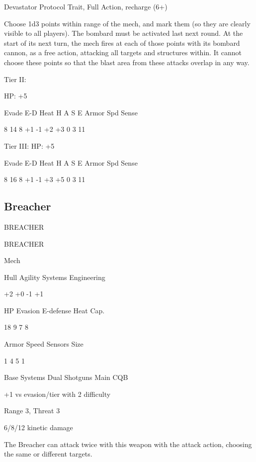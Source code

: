 Devastator Protocol  
Trait, Full Action, recharge (6+)
 
Choose 1d3 points within range of the mech, and mark them (so they are clearly visible to all  
players). The bombard must be activated last next round. At the start of its next turn, the mech  
fires at each of those points with its bombard cannon, as a free action, attacking all targets and  
structures within. It cannot choose these points so that the blast area from these attacks overlap  
in any way.
 

Tier II:
 
HP: +5
 

          Evade    E-D    Heat     H    A     S     E       Armor        Spd      Sense 

          8        14     8        +1   -1    +2    +3      0            3        11 

Tier III:  
HP: +5
 

          Evade    E-D    Heat     H    A     S     E       Armor        Spd      Sense 

          8        16     8        +1   -1    +3    +5      0            3        11 

                                                                                                                
\subsection{Breacher}

                                              BREACHER  

 BREACHER 

 Mech 

 Hull       Agility      Systems       Engineering 

 +2         +0           -1            +1 

 HP         Evasion      E-defense     Heat Cap. 

 18         9            7             8 

 Armor      Speed        Sensors       Size 

 1          4            5             1 

Base Systems  
Dual Shotguns  
Main CQB
 
+1 vs evasion/tier with 2 difficulty
 
Range 3, Threat 3
 
6/8/12 kinetic damage
 
The Breacher can attack twice with this weapon with the attack action, choosing the same or  
different targets.
 


